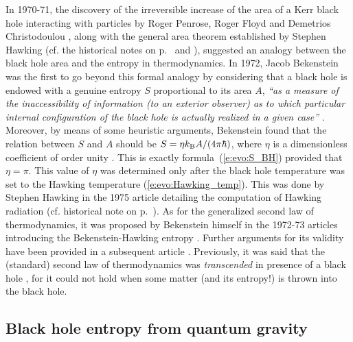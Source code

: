 \begin{hist}
In 1970-71, the discovery of
the irreversible increase of the area of a Kerr black hole interacting with particles
by Roger Penrose, Roger Floyd
and Demetrios Christodoulou
\cite{PenroF71,Chris70}, along with
the general area theorem established by Stephen Hawking \cite{Hawki71}
(cf. the historical notes on p.~\pageref{h:evo:irreducible_mass} and \pageref{h:evo:area_increase}),
suggested an analogy between the black hole area and the entropy in thermodynamics.
In 1972, Jacob Bekenstein  \cite{Beken72,Beken73b} was the first
to go beyond this formal analogy by considering that
a black hole is endowed with a genuine entropy $S$ proportional to its area $A$,
\emph{``as a measure of the inaccessibility of information (to an exterior observer) as to which
particular internal configuration of the black hole is actually realized in a given case''} \cite{Beken73b}.
Moreover, by means of some heuristic arguments, Bekenstein found that the relation
between $S$ and $A$ should be $S = \eta k_{\rm B} A/(4\pi\hbar)$, where $\eta$ is a dimensionless coefficient of
order unity \cite{Beken72,Beken73b}. This is exactly formula~(\ref{e:evo:S_BH}) provided that $\eta = \pi$.
This value of $\eta$ was determined only after the black hole temperature was set to the Hawking temperature
(\ref{e:evo:Hawking_temp}). This was done by Stephen Hawking in the 1975 article detailing the
computation of Hawking radiation \cite{Hawki75} (cf. historical note on p.~\pageref{h:evo:Hawking_rad}).
As for the generalized second law of thermodynamics, it was proposed by Bekenstein himself in the 1972-73 articles introducing the Bekenstein-Hawking entropy \cite{Beken72,Beken73b}.
Further arguments for its validity have been provided in a subsequent article \cite{Beken74}.
Previously, it was said that the (standard) second law of thermodynamics was \emph{transcended}
in presence of a black hole \cite{BardeCH73,Carte73b}, for it could not hold when some matter (and its entropy!) is thrown into the black hole.
\end{hist}

\subsection{Black hole entropy from quantum gravity} \label{s:evo:quantum_entropy}

